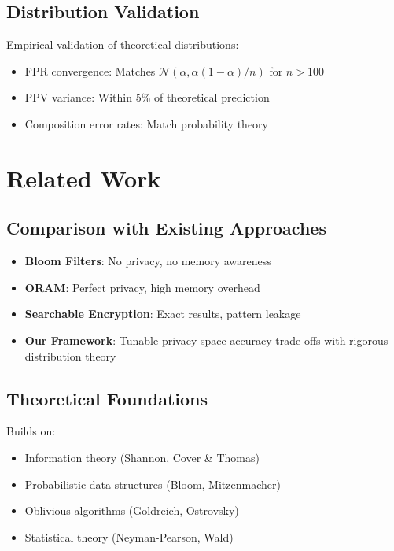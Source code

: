 \documentclass[11pt,final]{article}
\begin{document}
\subsection{Distribution Validation}

Empirical validation of theoretical distributions:
\begin{itemize}
    \item FPR convergence: Matches $\mathcal{N}(\alpha, \alpha(1-\alpha)/n)$ for $n > 100$
    \item PPV variance: Within 5\% of theoretical prediction
    \item Composition error rates: Match probability theory
\end{itemize}

\section{Related Work}

\subsection{Comparison with Existing Approaches}

\begin{itemize}
    \item \textbf{Bloom Filters}: No privacy, no memory awareness
    \item \textbf{ORAM}: Perfect privacy, high memory overhead
    \item \textbf{Searchable Encryption}: Exact results, pattern leakage
    \item \textbf{Our Framework}: Tunable privacy-space-accuracy trade-offs with rigorous distribution theory
\end{itemize}

\subsection{Theoretical Foundations}

Builds on:
\begin{itemize}
    \item Information theory (Shannon, Cover \& Thomas)
    \item Probabilistic data structures (Bloom, Mitzenmacher)
    \item Oblivious algorithms (Goldreich, Ostrovsky)
    \item Statistical theory (Neyman-Pearson, Wald)
\end{itemize}
\end{document}
